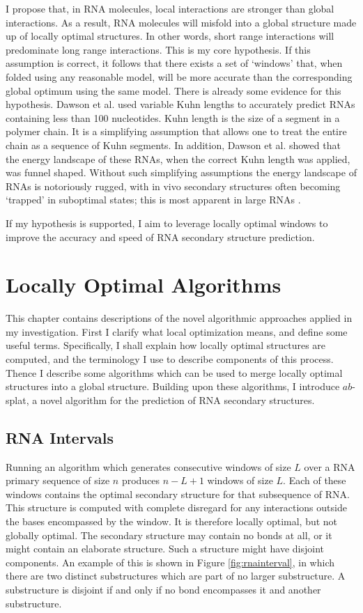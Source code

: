 \documentclass{cshonours}
\begin{document}
I propose that, in RNA molecules, local interactions are stronger than global interactions. As a result, RNA molecules will misfold into a global structure made up of locally optimal structures. In other words, short range interactions will predominate long range interactions. This is my core hypothesis. If this assumption is correct, it follows that there exists a set of `windows' that, when folded using any reasonable model, will be more accurate than the corresponding global optimum using the same model. There is already some evidence for this hypothesis. Dawson et al. \cite{dawson2013new} used variable Kuhn lengths to accurately predict RNAs containing less than 100 nucleotides. Kuhn length is the size of a segment in a polymer chain. It is a simplifying assumption that allows one to treat the entire chain as a sequence of Kuhn segments. In addition, Dawson et al. showed that the energy landscape of these RNAs, when the correct Kuhn length was applied, was funnel shaped. Without such simplifying assumptions the energy landscape of RNAs is notoriously rugged, with in vivo secondary structures often becoming `trapped' in suboptimal states; this is most apparent in large RNAs \cite{ditzler2008rugged}.

If my hypothesis is supported, I aim to leverage locally optimal windows to improve the accuracy and speed of RNA secondary structure prediction.

\chapter{Locally Optimal Algorithms}

This chapter contains descriptions of the novel algorithmic approaches applied in my investigation. First I clarify what local optimization means, and define some useful terms. Specifically, I shall explain how locally optimal structures are computed, and the terminology I use to describe components of this process. Thence I describe some algorithms which can be used to merge locally optimal structures into a global structure. Building upon these algorithms, I introduce $ab$-splat, a novel algorithm for the prediction of RNA secondary structures.

\section{RNA Intervals}
Running an algorithm which generates consecutive windows of size $L$ over a RNA primary sequence of size $n$ produces $n-L+1$ windows of size $L$. Each of these windows contains the optimal secondary structure for that subsequence of RNA. This structure is computed with complete disregard for any interactions outside the bases encompassed by the window. It is therefore locally optimal, but not globally optimal. The secondary structure may contain no bonds at all, or it might contain an elaborate structure. Such a structure might have disjoint components. An example of this is shown in Figure \ref{fig:rnainterval}, in which there are two distinct substructures which are part of no larger substructure. A substructure is disjoint if and only if no bond encompasses it and another substructure.
\end{document}
